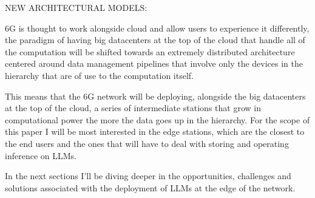 \bigskip
\noindent
NEW ARCHITECTURAL MODELS:
\label{ssec:architectural-models}

6G is thought to work alongside cloud and allow users to experience it differently, the paradigm of having
big datacenters at the top of the cloud that handle all of the computation will be shifted towards an extremely distributed architecture centered around data management pipelines that involve only the devices in the hierarchy that are of use to the computation itself.

This means that the 6G network will be deploying, alongside the big datacenters at the top of the cloud, a series of intermediate stations that grow in computational power the more the data goes up in the hierarchy. For the scope of this paper I will be most interested in the edge stations, which are the closest to the end users and the ones that will have to deal with storing and operating inference on LLMs.

\medskip
In the next sections I’ll be diving deeper in the opportunities, challenges and solutions associated with the deployment of LLMs at the edge of the network.
